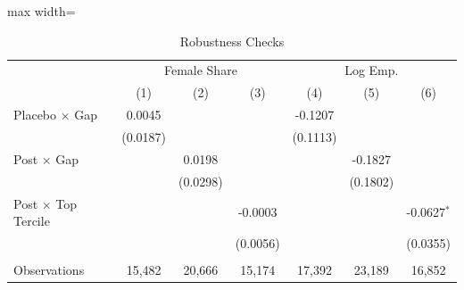 
\begin{table}[htbp]
   \caption{\label{tab:robust} Robustness Checks}
   \bigskip
   \centering
   \begin{adjustbox}{max width=\textwidth}
   \begin{tabular}{lcccccc}
      \toprule
       & \multicolumn{3}{c}{Female Share} & \multicolumn{3}{c}{Log Emp.}\\    
                                  & (1)                               & (2)                                 & (3)                               & (4)                                 & (5)                               & (6)\\  
      \midrule 
      Placebo $\times$ Gap        & 0.0045                            &                                     &                                   & -0.1207                             &                                   &   \\   
                                  & (0.0187)                          &                                     &                                   & (0.1113)                            &                                   &   \\   
      Post $\times$ Gap           &                                   & 0.0198                              &                                   &                                     & -0.1827                           &   \\   
                                  &                                   & (0.0298)                            &                                   &                                     & (0.1802)                          &   \\   
      Post $\times$ Top Tercile   &                                   &                                     & -0.0003                           &                                     &                                   & -0.0627$^{*}$\\   
                                  &                                   &                                     & (0.0056)                          &                                     &                                   & (0.0355)\\   
       \\
      Observations                & 15,482                            & 20,666                              & 15,174                            & 17,392                              & 23,189                            & 16,852\\  

\end{tabular}
\end{adjustbox}
\end{table}
